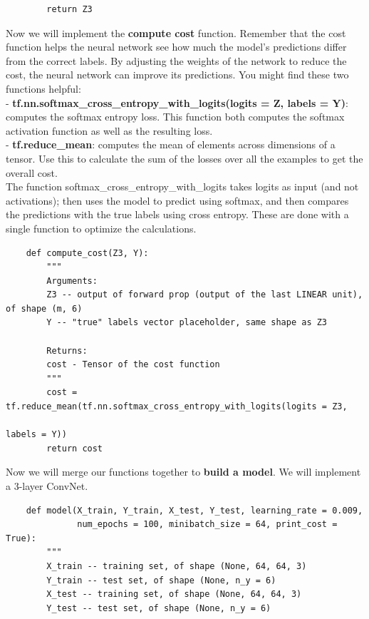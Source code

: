 \documentclass[11pt, a4paper]{article}
\begin{document}
\begin{spacing}{1.1}
\begin{lstlisting}
		return Z3 \end{lstlisting} \vspace*{1mm}
	Now we will implement the \textbf{compute cost} function. Remember that the cost function helps the neural network see how much the model's predictions differ from the correct labels.  By adjusting the weights of the network to reduce the cost, the neural network can improve its predictions. You might find these two functions helpful: \vspace*{.5mm}\\	
	- \textbf{tf.nn.softmax\_cross\_entropy\_with\_logits(logits = Z, labels = Y)}: computes the softmax entropy loss. This function both computes the softmax activation function as well as the resulting loss. \vspace*{.5mm}\\
	- \textbf{tf.reduce\_mean}: computes the mean of elements across dimensions of a tensor. Use this to calculate the sum of the losses over all the examples to get the overall cost.\vspace*{.5mm}\\
	The function softmax\_cross\_entropy\_with\_logits takes logits as input (and not activations); then uses the model to predict using softmax, and then compares the predictions with the true labels using cross entropy.  These are done with a single function to optimize the calculations.
	\begin{lstlisting}
	def compute_cost(Z3, Y):
		"""
		Arguments:
		Z3 -- output of forward prop (output of the last LINEAR unit), of shape (m, 6)
		Y -- "true" labels vector placeholder, same shape as Z3
		
		Returns:
		cost - Tensor of the cost function
		"""
		cost = tf.reduce_mean(tf.nn.softmax_cross_entropy_with_logits(logits = Z3, 
		                                                              labels = Y))
		return cost	\end{lstlisting} \newpage
	
	\noindent Now we will merge our functions together to \textbf{build a model}. We will implement a 3-layer ConvNet.
	\begin{lstlisting}
	def model(X_train, Y_train, X_test, Y_test, learning_rate = 0.009,
              num_epochs = 100, minibatch_size = 64, print_cost = True):
		"""	
		X_train -- training set, of shape (None, 64, 64, 3)
		Y_train -- test set, of shape (None, n_y = 6)
		X_test -- training set, of shape (None, 64, 64, 3)
		Y_test -- test set, of shape (None, n_y = 6)
		

\end{lstlisting}
\end{spacing}
\end{document}
